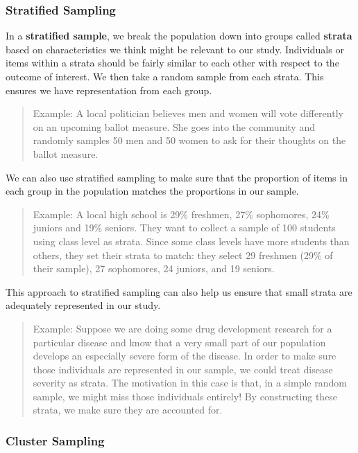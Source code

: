 \documentclass[
]{book}
\begin{document}
\subsubsection*{Stratified Sampling}\label{stratified-sampling}

In a \textbf{stratified sample}, we break the population down into groups called \textbf{strata} based on characteristics we think might be relevant to our study. Individuals or items within a strata should be fairly similar to each other with respect to the outcome of interest. We then take a random sample from each strata. This ensures we have representation from each group.

\begin{quote}
Example: A local politician believes men and women will vote differently on an upcoming ballot measure. She goes into the community and randomly samples 50 men and 50 women to ask for their thoughts on the ballot measure.
\end{quote}

We can also use stratified sampling to make sure that the proportion of items in each group in the population matches the proportions in our sample.

\begin{quote}
Example: A local high school is 29\% freshmen, 27\% sophomores, 24\% juniors and 19\% seniors. They want to collect a sample of 100 students using class level as strata. Since some class levels have more students than others, they set their strata to match: they select 29 freshmen (29\% of their sample), 27 sophomores, 24 juniors, and 19 seniors.
\end{quote}

This approach to stratified sampling can also help us ensure that small strata are adequately represented in our study.

\begin{quote}
Example: Suppose we are doing some drug development research for a particular disease and know that a very small part of our population develops an especially severe form of the disease. In order to make sure those individuals are represented in our sample, we could treat disease severity as strata. The motivation in this case is that, in a simple random sample, we might miss those individuals entirely! By constructing these strata, we make sure they are accounted for.
\end{quote}

\subsubsection*{Cluster Sampling}\label{cluster-sampling}
\end{document}
